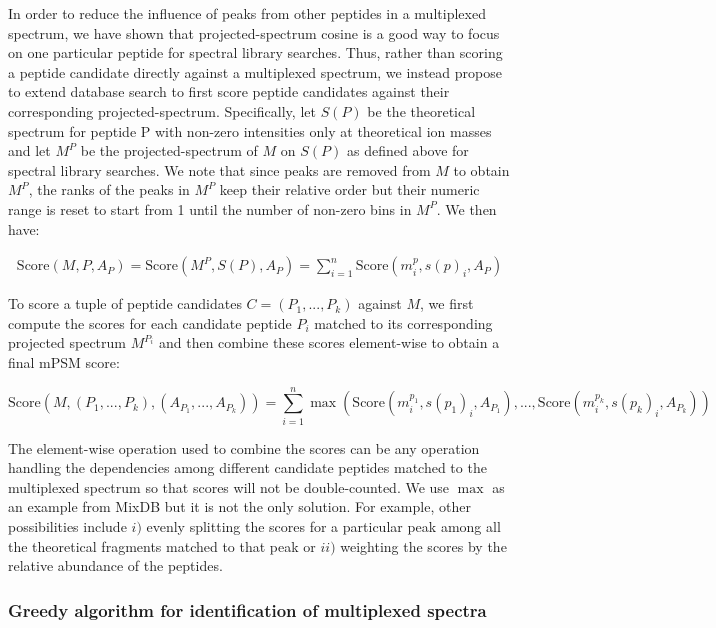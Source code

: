 \documentclass[arial,11pt]{article}
\begin{document}
In order to reduce the influence of peaks from other peptides in a multiplexed spectrum, we have shown that projected-spectrum cosine is a good way to focus on one particular peptide for spectral library searches.  Thus, rather than scoring a peptide candidate directly against a multiplexed spectrum, we instead propose to extend database search to first score peptide candidates against their corresponding projected-spectrum.  Specifically, let $S(P)$ be the theoretical spectrum for peptide P with non-zero intensities only at theoretical ion masses and let $M^P$ be the projected-spectrum of $M$ on $S(P)$ as defined above for spectral library searches. We note that since peaks are removed from $M$ to obtain $M^P$, the ranks of the peaks in $M^P$ keep their relative order but their numeric range is reset to start from 1 until the number of non-zero bins in $M^P$. We then have:

\begin{eqnarray*}
\text{Score}(M,P,A_{P})=\text{Score}(M^P,S(P),A_P) = \sum_{i=1}^{n}{\text{Score}(m^p_i,s(p)_i,A_P)}
\end{eqnarray*}

To score a tuple of peptide candidates $C=(P_1, ..., P_k)$ against $M$, we first compute the scores for each candidate peptide $P_i$ matched to its corresponding projected spectrum $M^{P_i}$ and then combine these scores element-wise to obtain a final mPSM score:

\begin{equation*}
\text{Score}(M,(P_1,..., P_k),(A_{P_1},..., A_{P_{k}})) = \sum_{i=1}^{n}{\max(\text{Score}(m^{p_{1}}_i, s(p_1)_i,A_{P_{1}}),..., \text{Score}(m^{p_k}_i, s(p_k)_i, A_{P_k}))}
\end{equation*}

The element-wise operation used to combine the scores can be any operation handling the dependencies among different candidate peptides matched to the multiplexed spectrum so that scores will not be double-counted. We use $\max$ as an example from MixDB but it is not the only solution. For example, other possibilities include $i)$ evenly splitting the scores for a particular peak among all the theoretical fragments matched to that peak or $ii)$ weighting the scores by the relative abundance of the peptides.

\subsubsection{Greedy algorithm for identification of multiplexed spectra}
\end{document}
